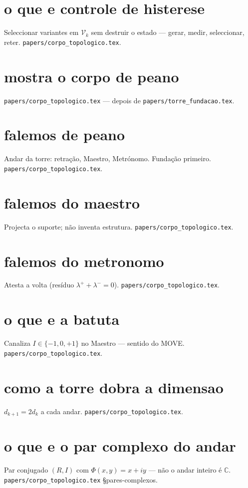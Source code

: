 \documentclass[11pt,a4paper]{article}
\newcommand{\code}[1]{\texttt{\small #1}}
\begin{document}
\section{o que e controle de histerese}
Seleccionar variantes em $\mathcal{V}_k$ sem destruir o estado --- gerar, medir, seleccionar, reter.
\code{papers/corpo\_topologico.tex}.

\section{mostra o corpo de peano}
\code{papers/corpo\_topologico.tex} --- depois de \code{papers/torre\_fundacao.tex}.

\section{falemos de peano}
Andar da torre: retração, Maestro, Metrónomo. Fundação primeiro.
\code{papers/corpo\_topologico.tex}.

\section{falemos do maestro}
Projecta o suporte; não inventa estrutura.
\code{papers/corpo\_topologico.tex}.

\section{falemos do metronomo}
Atesta a volta (resíduo $\lambda^{+}+\lambda^{-}=0$).
\code{papers/corpo\_topologico.tex}.

\section{o que e a batuta}
Canaliza $I\in\{-1,0,+1\}$ no Maestro --- sentido do MOVE.
\code{papers/corpo\_topologico.tex}.

\section{como a torre dobra a dimensao}
$d_{k+1}=2d_k$ a cada andar.
\code{papers/corpo\_topologico.tex}.

\section{o que e o par complexo do andar}
Par conjugado $(R,I)$ com $\Phi(x,y)=x+iy$ --- não o andar inteiro é $\mathbb{C}$.
\code{papers/corpo\_topologico.tex} \S pares-complexos.
\end{document}
